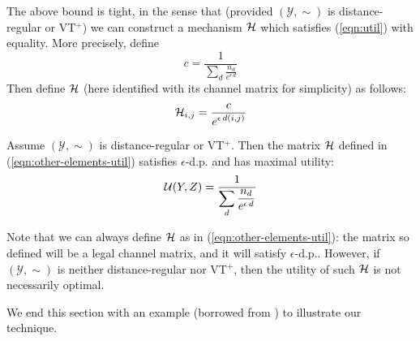 \documentclass{llncs}
\newcommand{\caly}{\mathcal{Y}}
\begin{document}
The above bound is tight, in the sense that (provided $(\caly,\sim)$ is distance-regular  or  VT$^+$) we can construct a mechanism $\cal H$ which satisfies (\ref{eqn:util}) with equality. 
More precisely, define  
\[c = \frac{1}{\displaystyle  \sum_{d}  \frac{n_d}{e^{\epsilon \,d}}}\]
Then define $\cal H$ (here identified with its channel matrix for simplicity) as follows: 
 \begin{equation}\label{eqn:other-elements-util}
{\cal H}_{i,j}= \frac{c}{\displaystyle e^{\epsilon \,d(i,j)}}
\end{equation}

\begin{theorem}\label{theo:maxutil}
Assume $({\caly}, \sim)$ is   distance-regular or VT$^+$. Then the matrix    $\cal H$ defined in (\ref{eqn:other-elements-util}) satisfies $\epsilon$-d.p.
and has maximal utility: 
\begin{equation*}\label{eqn:maxutil}
 {\cal U}(Y,Z) =   \frac{1}{\displaystyle  \sum_{d}  \frac{n_d}{e^{\epsilon \,d}}} 
\end{equation*}
\end{theorem}

Note that we can always define $\cal H$ as in (\ref{eqn:other-elements-util}): the matrix so defined will be a legal channel matrix, and it will satisfy $\epsilon$-d.p.. 
However, if $({\caly}, \sim)$ is  neither  distance-regular nor VT$^+$, then the utility of such $\cal H$ is not necessarily optimal. 


We end this section with an example (borrowed from \cite{Alvim:11:TechRep}) to illustrate our technique. 
\end{document}
